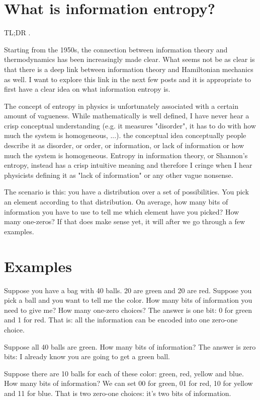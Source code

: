 \documentclass[aps,pra,10pt,floatfix,nofootinbib]{revtex4-1}
\theoremstyle{definition}
\begin{document}
	
\section{What is information entropy?}

TL;DR .

Starting from the 1950s, the connection between information theory and thermodynamics has been increasingly made clear. What seems not be as clear is that there is a deep link between information theory and Hamiltonian mechanics as well. I want to explore this link in the next few posts and it is appropriate to first have a clear idea on what information entropy is.

The concept of entropy in physics is unfortunately associated with a certain amount of vagueness. While mathematically is well defined, I have never hear a crisp conceptual understanding (e.g. it measures "disorder", it has to do with how much the system is homogeneous, ...). the conceptual idea conceptually people describe it as disorder, or order, or information, or lack of information or how much the system is homogeneous. Entropy in information theory, or Shannon's entropy, instead has a crisp intuitive meaning and therefore I cringe when I hear physicists defining it as "lack of information" or any other vague nonsense.

The scenario is this: you have a distribution over a set of possibilities. You pick an element according to that distribution. On average, how many bits of information you have to use to tell me which element have you picked? How many one-zeros? If that does make sense yet, it will after we go through a few examples.

\section{Examples}

Suppose you have a bag with 40 balls. 20 are green and 20 are red. Suppose you pick a ball and you want to tell me the color. How many bits of information you need to give me? How many one-zero choices? The answer is one bit: 0 for green and 1 for red. That is: all the information can be encoded into one zero-one choice.

Suppose all 40 balls are green. How many bits of information? The answer is zero bits: I already know you are going to get a green ball.

Suppose there are 10 balls for each of these color: green, red, yellow and blue. How many bits of information? We can set 00 for green, 01 for red, 10 for yellow and 11 for blue. That is two zero-one choices: it's two bits of information.
\end{document}
